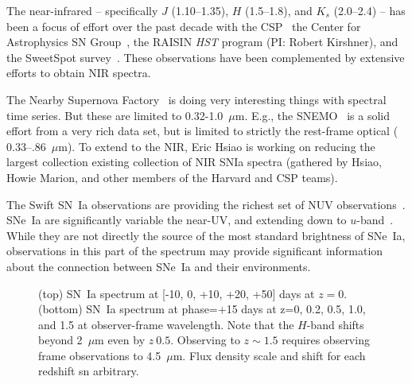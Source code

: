 \documentclass[12pt,preprint]{aastex}
\newcommand{\snia}{SN~Ia\xspace}
\newcommand{\sneia}{SNe~Ia\xspace}
\newcommand{\tbd}{{\color{red}}}
\begin{document}
The near-infrared -- specifically $J$ (1.10--1.35), $H$ (1.5--1.8), and $K_s$ (2.0--2.4) -- has been a focus of effort over the past decade with the CSP~\citep{Contreras10, Krisciunas17} the Center for Astrophysics SN Group~\citep{Wood-Vasey08, Friedman15}, the RAISIN {\it HST} program (PI: Robert Kirshner), and the SweetSpot survey~\citep{Weyant14, Weyant18}.  These observations have been complemented by extensive efforts to obtain NIR spectra.


The Nearby Supernova Factory~\citep{Aldering02} is doing very interesting things with spectral time series.  But these are limited to 0.32-1.0~$\mu$m.  E.g., the SNEMO~\citep{Saunders18} is a solid effort from a very rich data set, but is limited to strictly the rest-frame optical ($0.33$--$.86$~$\mu$m).  To extend to the NIR, Eric Hsiao is working on reducing the largest collection existing collection of NIR SNIa spectra (gathered by Hsiao, Howie Marion, and other members of the Harvard and CSP teams).

The Swift \snia observations are providing the richest set of NUV observations~\citep{Brown09, Milne10}.
\sneia are significantly variable the near-UV, and extending down to $u$-band~\citep{Jha06, Brown10}.  While they are not directly the source of the most standard brightness of \sneia, observations in this part of the spectrum may provide significant information about the connection between \sneia and their environments.
\fi


\begin{figure}
\caption{
(top) \snia spectrum at [-10, 0, +10, +20, +50] days at $z=0$. %
(bottom) \snia spectrum at phase=+15 days at z=0, 0.2, 0.5, 1.0, and 1.5 at observer-frame wavelength.  Note that the $H$-band shifts beyond 2~$\mu$m even by $z~0.5$.  Observing to $z\sim1.5$ requires observing frame observations to 4.5~$\mu$m.
Flux density scale and shift for each redshift sn arbitrary.
}
\end{figure}
\end{document}
